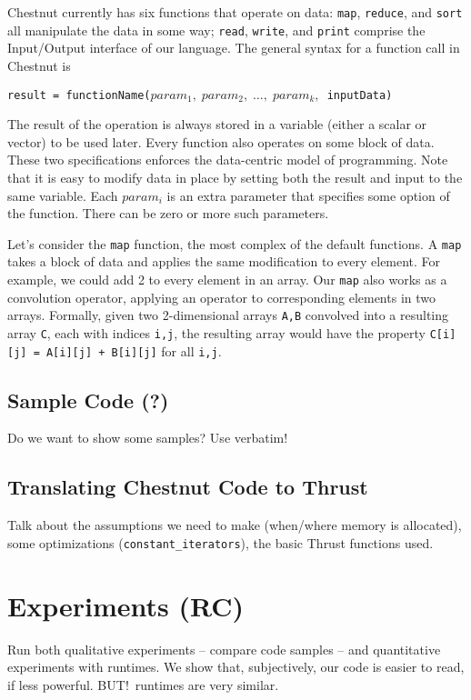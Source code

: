 \documentclass{article}
\renewcommand{\|}{\origbar} %
\newcommand{\code}[1]{\texttt{#1}}
\begin{document}
Chestnut currently has six functions that operate on data: \code{map}, \code{reduce}, and \code{sort} all manipulate the data in some way; \code{read}, \code{write}, and \code{print} comprise the Input/Output interface of our language. The general syntax for a function call in Chestnut is
\begin{center}
  \code{result = functionName($param_1,\;param_2, \;\ldots, \;param_k,$ inputData)}
\end{center}
The result of the operation is always stored in a variable (either a scalar or vector) to be used later. Every function also operates on some block of data. These two specifications enforces the data-centric model of programming. Note that it is easy to modify data in place by setting both the result and input to the same variable. Each $param_i$ is an extra parameter that specifies some option of the function. There can be zero or more such parameters. 

Let's consider the \code{map} function, the most complex of the default functions. A \code{map} takes a block of data and applies the same modification to every element. For example, we could add 2 to every element in an array. Our \code{map} also works as a convolution operator, applying an operator to corresponding elements in two arrays. Formally, given two 2-dimensional arrays \code{A,B} convolved into a resulting array \code{C}, each with indices \code{i,j}, the resulting array would have the property \code{C[i][j]~=~A[i][j]~+~B[i][j]} for all \code{i,j}.


\subsection{Sample Code (?)}

Do we want to show some samples? Use verbatim!

\subsection{Translating Chestnut Code to Thrust}

Talk about the assumptions we need to make (when/where memory is allocated), some optimizations (\code{constant\_iterators}), the basic Thrust functions used.

\section{Experiments (RC)}

Run both qualitative experiments -- compare code samples -- and quantitative experiments with runtimes. We show that, subjectively, our code is easier to read, if less powerful. BUT!\ runtimes are very similar.
\end{document}

